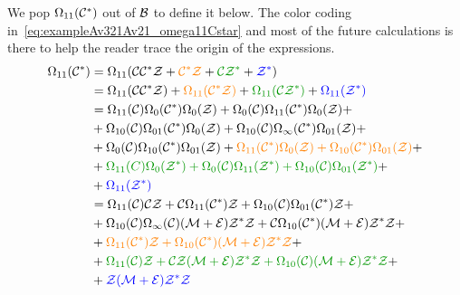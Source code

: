 \documentclass[12pt, a4paper, twoside]{report}
\begin{document}
We pop $\Omega_{11}(\mathcal{C}^*)$ out of $\mathcal{B}$ to define it below. The color coding in~\eqref{eq:exampleAv321Av21_omega11Cstar} and most of the future calculations is there to help the reader trace the origin of the expressions.
\begin{align}
  \begin{aligned}
  \Omega_{11}(\Cstar) &= \Omega_{11}(\C\Cstar\Z+ \textcolor{orange}{\Cstar\Z} + \textcolor{green}{\C\Z^*} + \textcolor{blue}{\Z^*})\\
                      &= \Omega_{11}(\C\Cstar\Z) + \textcolor{orange}{\Omega_{11}(\Cstar\Z)} + \textcolor{green}{\Omega_{11}(\C\Z^*)} + \textcolor{blue}{\Omega_{11}(\Z^*)}\\
                      &= \Omega_{11}(\C)\Omega_0(\Cstar)\Omega_0(\Z) + \Omega_0(\C)\Omega_{11}(\Cstar)\Omega_0(\Z) +\\
                      &+ \Omega_{10}(\C)\Omega_{01}(\Cstar)\Omega_0(\Z) + \Omega_{10}(\C)\Omega_\infty(\Cstar)\Omega_{01}(\Z) +\\
                      &+ \Omega_0(\C)\Omega_{10}(\Cstar)\Omega_{01}(\Z) + \textcolor{orange}{\Omega_{11}(\Cstar)\Omega_0(\Z) + \Omega_{10}(\Cstar)\Omega_{01}(\Z)} +\\
                      &+ \textcolor{green}{\Omega_{11}(C)\Omega_0(\Z^*) + \Omega_0(\C)\Omega_{11}(\Z^*) + \Omega_{10}(\C)\Omega_{01}(\Z^*)} +\\
                      &+ \textcolor{blue}{\Omega_{11}(\Z^*)}\\
                      &= \Omega_{11}(\C)\C\Z + \C\Omega_{11}(\Cstar)\Z + \Omega_{10}(\C)\Omega_{01}(\Cstar)\Z +\\
                      &+ \Omega_{10}(\C)\Omega_\infty(\C)(\M+\EE)\Z^*\Z +\C\Omega_{10}(\Cstar)(\M+\EE)\Z^*\Z + \\
                      &+ \textcolor{orange}{\Omega_{11}(\Cstar)\Z + \Omega_{10}(\Cstar)(\M+\EE)\Z^*\Z} +\\
                      &+ \textcolor{green}{\Omega_{11}(\C)\Z + \C\Z(\M+\EE)\Z^*\Z + \Omega_{10}(\C)(\M+\EE)\Z^*\Z} +\\
                      &+\textcolor{blue}{\Z(\M+\EE)\Z^*\Z}\\
                    \end{aligned}
                        \label{eq:exampleAv321Av21_omega11Cstar}
\end{align}
\end{document}
